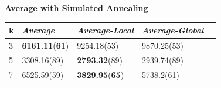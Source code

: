 \documentclass[12pt,a4paper,twoside]{scrartcl}
\numberwithin{equation}{section}
\begin{document}
  \clearpage
\textbf{ Average with Simulated Annealing}
 \begin{table}[H]
\begin{center}
    \begin{tabular}{|l|l|l|l|p{3cm}|}
\hline 
   k &\emph{Average}&\emph{Average-Local}&\emph{Average-Global} \\ \hline      
    3 & \textbf{6161.11}(\textbf{61})	&9254.18(53)&	9870.25(53) \\ \hline
    5& 3308.16(89)	&\textbf{2793.32}(89)&	2939.74(89)\\ \hline
    7& 6525.59(59)&\textbf{	3829.95}(\textbf{65})	&5738.2(61)\\ \hline
    \end{tabular}
\end{center}
\end{table}
\end{document}
